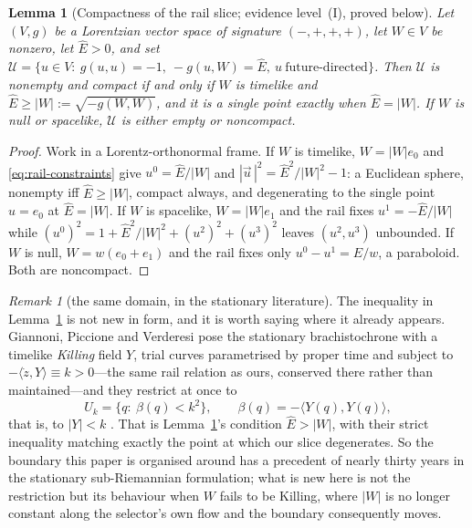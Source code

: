 \documentclass[12pt]{iopart}
\theoremstyle{plain}
\newtheorem{lemma}[proposition]{Lemma}
\theoremstyle{definition}
\theoremstyle{remark}
\newtheorem{remark}[proposition]{Remark}
\newcommand{\Ehat}{\hat E}
\begin{document}
\begin{lemma}[Compactness of the rail slice; evidence level~(I), proved below]
\label{lem:compact}
Let $(V,g)$ be a Lorentzian vector space of signature $(-,+,+,+)$, let $W\in V$
be nonzero, let $\Ehat>0$, and set
$\mathcal U=\{u\in V:\ g(u,u)=-1,\ -g(u,W)=\Ehat,\ u\ \text{future-directed}\}$.
Then $\mathcal U$ is nonempty and compact if and only if $W$ is timelike and
$\Ehat\ge|W|:=\sqrt{-g(W,W)}$, and it is a single point exactly when
$\Ehat=|W|$. If $W$ is null or spacelike, $\mathcal U$ is either empty or
noncompact.
\end{lemma}

\begin{proof}
Work in a Lorentz-orthonormal frame. If $W$ is timelike, $W=|W|e_0$ and
\eqref{eq:rail-constraints} give $u^0=\Ehat/|W|$ and
$|\vec u\,|^2=\Ehat^2/|W|^2-1$: a Euclidean sphere, nonempty iff $\Ehat\ge|W|$,
compact always, and degenerating to the single point $u=e_0$ at $\Ehat=|W|$. If
$W$ is spacelike, $W=|W|e_1$ and the rail fixes $u^1=-\Ehat/|W|$ while
$(u^0)^2=1+\Ehat^2/|W|^2+(u^2)^2+(u^3)^2$ leaves $(u^2,u^3)$ unbounded. If $W$ is
null, $W=w(e_0+e_1)$ and the rail fixes only $u^0-u^1=\Ehat/w$, a paraboloid.
Both are noncompact.
\end{proof}

\begin{remark}[the same domain, in the stationary literature]
\label{rmk:gpv-domain}
The inequality in Lemma~\ref{lem:compact} is not new in form, and it is worth
saying where it already appears. Giannoni, Piccione and Verderesi pose the
stationary brachistochrone with a timelike \emph{Killing} field $Y$, trial curves
parametrised by proper time and subject to $-\langle\dot z,Y\rangle\equiv k>0$---the
same rail relation as ours, conserved there rather than maintained---and they
restrict at once to
\begin{equation}
    U_k=\{q:\ \beta(q)<k^2\},\qquad \beta(q)=-\langle Y(q),Y(q)\rangle ,
    \label{eq:gpv-Uk}
\end{equation}
that is, to $|Y|<k$ \cite[Eqs.~(2)--(3)]{GiannoniPiccioneVerderesi1997}. That is
Lemma~\ref{lem:compact}'s condition $\Ehat>|W|$, with their strict inequality
matching exactly the point at which our slice degenerates. So the boundary this
paper is organised around has a precedent of nearly thirty years in the stationary
sub-Riemannian formulation; what is new here is not the restriction but its
behaviour when $W$ fails to be Killing, where $|W|$ is no longer constant along the
selector's own flow and the boundary consequently moves.
\end{remark}
\end{document}

